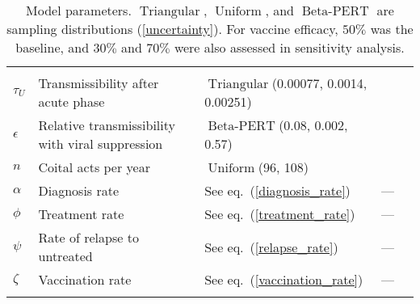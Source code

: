 \documentclass{article}
\DeclareMathOperator{\Uniform}{Uniform}
\DeclareMathOperator{\Triangular}{Triangular}
\DeclareMathOperator{\BetaPERT}{Beta-PERT}
\begin{document}
\begin{table}
\begin{center}
\begin{tabularx}{\textwidth}{lXlll}
      & \cite{Wawer2005-us, Skarbinski2015-ni}\\
      $\tau_{U}$ & Transmissibility after acute phase
      & $\Triangular$(0.00077, 0.0014, 0.00251)
      & \cite{Hughes2012-so} \\
      $\epsilon$ & Relative transmissibility with
      viral suppression & $\BetaPERT$(0.08, 0.002, 0.57)
      & \cite{Donnell2010-xo, attia_2009, wilson_2012, jia_2013,
        rodger_2016} \\
      $n$ & Coital acts per year & $\Uniform$(96, 108)
      & \cite{Wawer2005-us, Abdool_Karim2010-cm}\\
      $\alpha$ & Diagnosis rate & See eq.~(\ref{diagnosis_rate}) & --- \\
      $\phi$ & Treatment rate & See eq.~(\ref{treatment_rate}) & --- \\
      $\psi$ & Rate of relapse to untreated & See eq.~(\ref{relapse_rate})
      & --- \\
      $\zeta$ & Vaccination rate & See eq.~(\ref{vaccination_rate}) & --- \\
      \hline
      \vspace*{-2.5em}
    \end{tabularx}
    \caption{Model parameters. $\Triangular$, $\Uniform$, and
      $\BetaPERT$ are sampling distributions (\autoref{uncertainty}).
      For vaccine efficacy, $50\%$ was the baseline, and $30\%$ and
      $70\%$ were also assessed in sensitivity analysis.}
    \label{model_param}
  \end{center}
\end{table}
\end{document}

